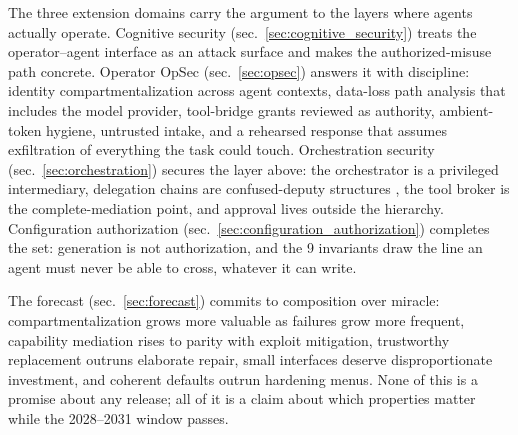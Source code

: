 \documentclass[
  english,
  9pt,
]{extarticle}
\begin{document}
The three extension domains carry the argument to the layers where
agents actually operate. Cognitive security
(sec.~\ref{sec:cognitive_security}) treats the operator--agent interface
as an attack surface and makes the authorized-misuse path concrete.
Operator OpSec (sec.~\ref{sec:opsec}) answers it with discipline:
identity compartmentalization across agent contexts, data-loss path
analysis that includes the model provider, tool-bridge grants reviewed
as authority, ambient-token hygiene, untrusted intake, and a rehearsed
response that assumes exfiltration of everything the task could touch.
Orchestration security (sec.~\ref{sec:orchestration}) secures the layer
above: the orchestrator is a privileged intermediary, delegation chains
are confused-deputy structures \citep{hardy1988, lampson1974}, the tool
broker is the complete-mediation point, and approval lives outside the
hierarchy. Configuration authorization
(sec.~\ref{sec:configuration_authorization}) completes the set:
generation is not authorization, and the 9 invariants draw the line an
agent must never be able to cross, whatever it can write.

The forecast (sec.~\ref{sec:forecast}) commits to composition over
miracle: compartmentalization grows more valuable as failures grow more
frequent, capability mediation rises to parity with exploit mitigation,
trustworthy replacement outruns elaborate repair, small interfaces
deserve disproportionate investment, and coherent defaults outrun
hardening menus. None of this is a promise about any release; all of it
is a claim about which properties matter while the 2028--2031 window
passes.
\end{document}

